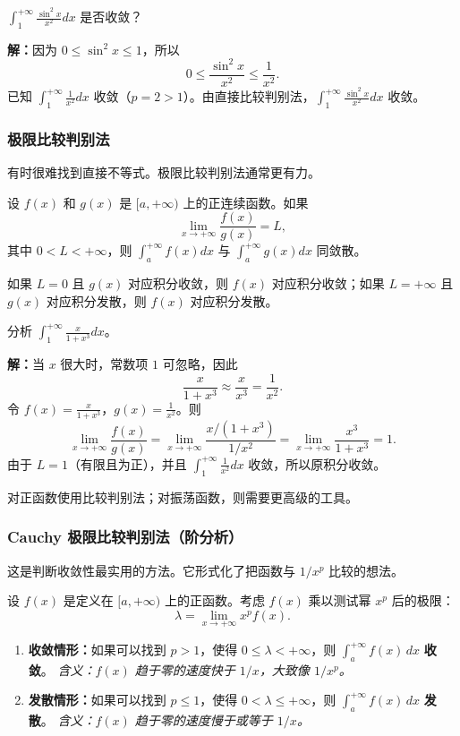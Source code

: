 \begin{example}
$\int_1^{+\infty}\frac{\sin^2x}{x^2}dx$ 是否收敛？
\end{example}
\textbf{解：}因为 $0\le \sin^2x\le 1$，所以
\[
0\le \frac{\sin^2x}{x^2}\le \frac{1}{x^2}.
\]
已知 $\int_1^{+\infty}\frac{1}{x^2}dx$ 收敛（$p=2>1$）。由直接比较判别法，$\int_1^{+\infty}\frac{\sin^2x}{x^2}dx$ 收敛。

\subsubsection{极限比较判别法}

有时很难找到直接不等式。极限比较判别法通常更有力。

\begin{theorem}
设 $f(x)$ 和 $g(x)$ 是 $[a,+\infty)$ 上的正连续函数。如果
\[
\lim_{x\to +\infty}\frac{f(x)}{g(x)}=L,
\]
其中 $0<L<+\infty$，则 $\int_a^{+\infty}f(x)dx$ 与 $\int_a^{+\infty}g(x)dx$ 同敛散。
\end{theorem}
如果 $L=0$ 且 $g(x)$ 对应积分收敛，则 $f(x)$ 对应积分收敛；如果 $L=+\infty$ 且 $g(x)$ 对应积分发散，则 $f(x)$ 对应积分发散。

\begin{example}
分析 $\int_1^{+\infty}\frac{x}{1+x^3}dx$。
\end{example}
\textbf{解：}当 $x$ 很大时，常数项 $1$ 可忽略，因此
\[
\frac{x}{1+x^3}\approx \frac{x}{x^3}=\frac{1}{x^2}.
\]
令 $f(x)=\frac{x}{1+x^3}$，$g(x)=\frac{1}{x^2}$。则
\[
\lim_{x\to +\infty}\frac{f(x)}{g(x)}=\lim_{x\to +\infty}\frac{x/(1+x^3)}{1/x^2}=\lim_{x\to +\infty}\frac{x^3}{1+x^3}=1.
\]
由于 $L=1$（有限且为正），并且 $\int_1^{+\infty}\frac{1}{x^2}dx$ 收敛，所以原积分收敛。

对正函数使用比较判别法；对振荡函数，则需要更高级的工具。

\subsubsection{Cauchy 极限比较判别法（阶分析）}
这是判断收敛性最实用的方法。它形式化了把函数与 $1/x^p$ 比较的想法。

\begin{theorem}
设 $f(x)$ 是定义在 $[a,+\infty)$ 上的正函数。考虑 $f(x)$ 乘以测试幂 $x^p$ 后的极限：
\[
\lambda=\lim_{x\to +\infty}x^p f(x).
\]
\begin{enumerate}
    \item \textbf{收敛情形：}如果可以找到 $p>1$，使得 $0\le \lambda<+\infty$，则 $\int_a^{+\infty}f(x)\,dx$ \textbf{收敛}。
    \textit{含义：$f(x)$ 趋于零的速度快于 $1/x$，大致像 $1/x^p$。}
    \item \textbf{发散情形：}如果可以找到 $p\le 1$，使得 $0<\lambda\le +\infty$，则 $\int_a^{+\infty}f(x)\,dx$ \textbf{发散}。
    \textit{含义：$f(x)$ 趋于零的速度慢于或等于 $1/x$。}
\end{enumerate}
\end{theorem}

